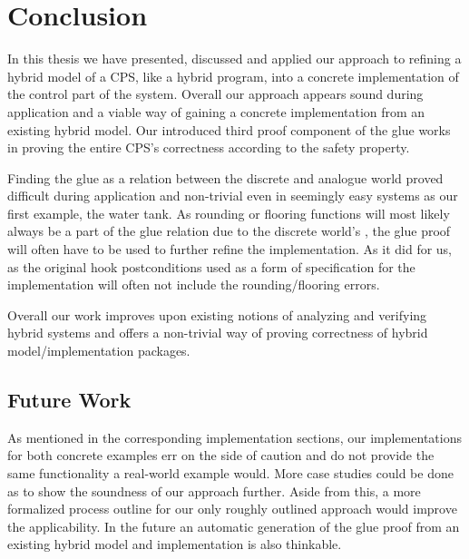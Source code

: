 
\chapter{Conclusion}
\label{ch:Conclusion}

In this thesis we have presented, discussed and applied our approach to refining a hybrid model of a CPS, like a hybrid program, into a concrete implementation of the control part of the system. Overall our approach appears sound during application and a viable way of gaining a concrete implementation from an existing hybrid model. Our introduced third proof component of the glue works in proving the entire CPS's correctness according to the safety property. 

Finding the glue as a relation between the discrete and analogue world proved difficult during application and non-trivial even in seemingly easy systems as our first example, the water tank. As rounding or flooring functions will most likely always be a part of the glue relation due to the discrete world's , the glue proof will often have to be used to further refine the implementation. As it did for us, as the original hook postconditions used as a form of specification for the implementation will often not include the rounding/flooring errors. 

Overall our work improves upon existing notions of analyzing and verifying hybrid systems and offers a non-trivial way of proving correctness of hybrid model/implementation packages.

\section{Future Work}
\label{con:fut} 

As mentioned in the corresponding implementation sections, our implementations for both concrete examples err on the side of caution and do not provide the same functionality a real-world example would. More case studies could be done as to show the soundness of our approach further. Aside from this, a more formalized process outline for our only roughly outlined approach would improve the applicability. In the future an automatic generation of the glue proof from an existing hybrid model and implementation is also thinkable.